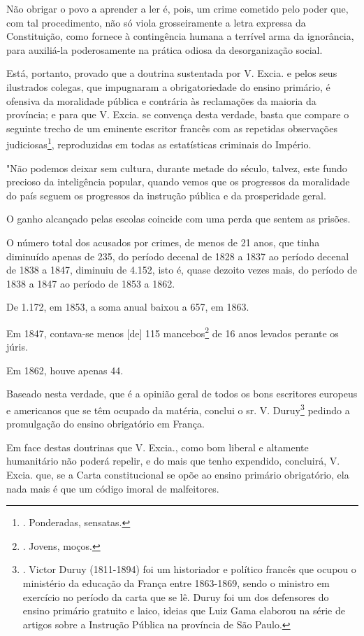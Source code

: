 Não obrigar o povo a aprender a ler é, pois, um crime cometido pelo
poder que, com tal procedimento, não só viola grosseiramente a letra
expressa da Constituição, como fornece à contingência humana a terrível
arma da ignorância, para auxiliá-la poderosamente na prática odiosa da
desorganização social.

Está, portanto, provado que a doutrina sustentada por V. Excia. e pelos
seus ilustrados colegas, que impugnaram a obrigatoriedade do ensino
primário, é ofensiva da moralidade pública e contrária às reclamações da
maioria da província; e para que V. Excia. se convença desta verdade,
basta que compare o seguinte trecho de um eminente escritor francês com
as repetidas observações judiciosas\footnote{. Ponderadas, sensatas.},
reproduzidas em todas as estatísticas criminais do Império.

"Não podemos deixar sem cultura, durante metade do século, talvez, este
fundo precioso da inteligência popular, quando vemos que os progressos
da moralidade do país seguem os progressos da instrução pública e da
prosperidade geral.

O ganho alcançado pelas escolas coincide com uma perda que sentem as
prisões.

O número total dos acusados por crimes, de menos de 21 anos, que tinha
diminuído apenas de 235, do período decenal de 1828 a 1837 ao período
decenal de 1838 a 1847, diminuiu de 4.152, isto é, quase dezoito vezes
mais, do período de 1838 a 1847 ao período de 1853 a 1862.

De 1.172, em 1853, a soma anual baixou a 657, em 1863.

Em 1847, contava-se menos {[}de{]} 115 mancebos\footnote{. Jovens,
  moços.} de 16 anos levados perante os júris.

Em 1862, houve apenas 44.

Baseado nesta verdade, que é a opinião geral de todos os bons escritores
europeus e americanos que se têm ocupado da matéria, conclui o sr. V.
Duruy\footnote{. Victor Duruy (1811-1894) foi um historiador e político
  francês que ocupou o ministério da educação da França entre 1863-1869,
  sendo o ministro em exercício no período da carta que se lê. Duruy foi
  um dos defensores do ensino primário gratuito e laico, ideias que Luiz
  Gama elaborou na série de artigos sobre a Instrução Pública na
  província de São Paulo.} pedindo a promulgação do ensino obrigatório
em França.

Em face destas doutrinas que V. Excia., como bom liberal e altamente
humanitário não poderá repelir, e do mais que tenho expendido,
concluirá, V. Excia. que, se a Carta constitucional se opõe ao ensino
primário obrigatório, ela nada mais é que um código imoral de
malfeitores.

